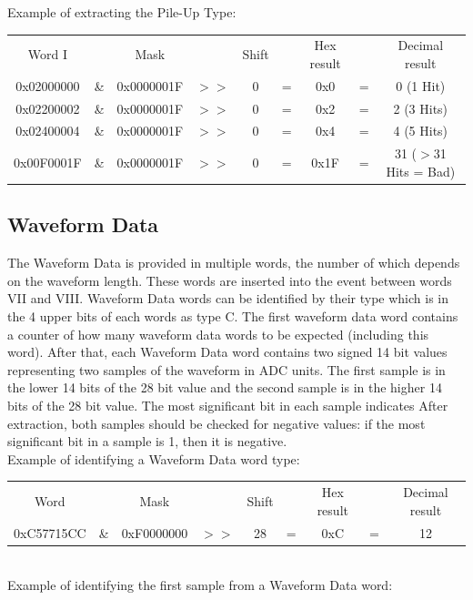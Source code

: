\documentclass[letterpaper,12pt,notitlepage]{report}
\begin{document}
Example of extracting the Pile-Up Type:\\

\begin{tabular}{ccccccccc}
Word I &  & Mask & & Shift & & Hex result & & Decimal result\\
0x02000000 & \& & 0x0000001F & $>>$ & 0 & = & 0x0 & = & 0 (1 Hit)\\
0x02200002 & \& & 0x0000001F & $>>$ & 0 & = & 0x2 & = & 2 (3 Hits)\\
0x02400004 & \& & 0x0000001F & $>>$ & 0 & = & 0x4 & = & 4 (5 Hits)\\
0x00F0001F & \& & 0x0000001F & $>>$ & 0 & = & 0x1F & = & 31 ($>$31 Hits = Bad)\\
\end{tabular}

\subsection{Waveform Data}
The Waveform Data is provided in multiple words, the number of which depends on the waveform length. These words are inserted into the event between words VII and VIII. Waveform Data words can be identified by their type which is in the 4 upper bits of each words as type C. The first waveform data word contains a counter of how many waveform data words to be expected (including this word). After that, each Waveform Data word contains two signed 14 bit values representing two samples of the waveform in ADC units. The first sample is in the lower 14 bits of the 28 bit value and the second sample is in the higher 14 bits of the 28 bit value. The most significant bit in each sample indicates  After extraction, both samples should be checked for negative values: if the most significant bit in a sample is 1, then it is negative.\\

Example of identifying a Waveform Data word type:\\

\begin{tabular}{ccccccccc}
Word &  & Mask & & Shift & & Hex result & & Decimal result\\
0xC57715CC & \& & 0xF0000000 & $>>$ & 28 & = & 0xC & = & 12\\
\end{tabular}\\

Example of identifying the first sample from a Waveform Data word:\\
\end{document}

